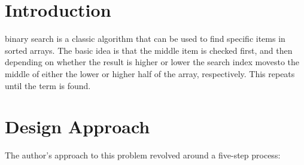 \documentclass[journal]{IEEEtran}
\begin{document}







\maketitle

\begin{abstract}
This paper presents a description of the design, documentation, and test results of a version of the famous binary search algorithm. For this paper, the algorithm was implemented in RISC-V assembly. Two versions were created, one for a single-cycle processor and one designed for a five-stage pipelined processor with forwarding but without error or hazard detection.
\end{abstract}




\section{Introduction}
% 
% 
% 
% 
 binary search is a classic algorithm that can be used to find specific items in sorted arrays. The basic idea is that the middle item is checked first, and then depending on whether the result is higher or lower the search index movesto the middle of either the lower or higher half of the array, respectively. This repeats until the term is found.

\section{Design Approach}
The author's approach to this problem revolved around a five-step process:
\end{document}
